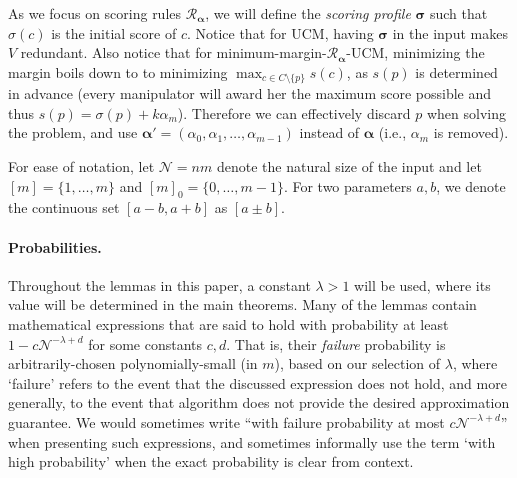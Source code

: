 \documentclass[letterpaper]{article} %
\theoremstyle{definition}
\newcommand{\NN}{\mathcal{N}}
\newcommand\vecgreek{\bm}
\newcommand{\veca}{\vecgreek{\alpha}}
\newcommand{\vecs}{\vecgreek{\sigma}}
\newcommand{\Ra}{\mathcal{R}_{\veca}}
\begin{document}
As we focus on scoring rules $\Ra$, we will define the \emph{scoring profile} $\vecgreek{\sigma}$ such that $\sigma(c)$ is the initial score of $c$. Notice that for UCM, having $\vecs$ in the input makes $V$ redundant. Also notice that for minimum-margin-$\Ra$-UCM, minimizing the margin boils down to to minimizing $\max_{c \in C \setminus \{p\}}s(c) $, as $s(p)$ is determined in advance (every manipulator will award her the maximum score possible and thus $s(p)=\sigma(p)+k\alpha_{m}$). Therefore we can effectively discard $p$ when solving the problem, and use  $\veca' = (\alpha_0,\alpha_1,\ldots,\alpha_{m-1})$ instead of $\veca$ (i.e., $\alpha_m$ is removed).


For ease of notation, let $\NN=nm$ denote the natural size of the input and let $[m]=\{1,\ldots,m\}$ and $[m]_0=\{0,\ldots,m-1\}$. For two parameters $a,b$, we denote the continuous set $[a-b,a+b]$ as $[a \pm b]$.



\paragraph{Probabilities.} 
Throughout the lemmas in this paper, a constant $\lambda > 1$ will be used, where its value will be  determined in the main theorems. Many of the lemmas contain mathematical expressions that are said to hold with probability at least $1-c\NN^{-\lambda+d}$ for some constants $c,d$. That is, their \emph{failure} probability is arbitrarily-chosen polynomially-small (in $m$), based on our selection of $\lambda$, where `failure' refers to the event that the discussed expression does not hold, and more generally, to the event that algorithm does not provide the desired approximation guarantee. We would sometimes write ``with failure probability  at most $c\NN^{-\lambda+d}$'' when presenting such expressions, and sometimes informally use the term  `with high probability' when the exact probability is clear from context.
\end{document}
